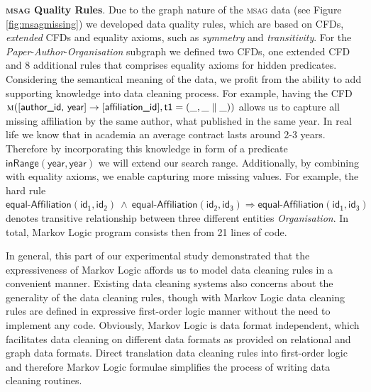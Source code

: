 \textbf{\textsc{msag} Quality Rules}.  
Due to the graph nature of the \textsc{msag} data (see Figure \ref{fig:msagmissing}) we developed data quality rules, which are based on CFDs, \textit{extended} CFDs \cite{Chen2009extended} and equality axioms, such as \textit{symmetry} and \textit{transitivity}. For the \textit{Paper}-\textit{Author}-\textit{Organisation} subgraph we defined two CFDs, one extended CFD and 8 additional rules that comprises equality axioms for hidden predicates. Considering the semantical meaning of the data, we profit from the ability to add supporting knowledge into data cleaning process. For example, having the CFD$\mathsf{\textsc{m}([\textsf{author\_id, year}] \rightarrow [\textsf{affiliation\_id}],t1=(\_,\_ \parallel \_))} $  allows us to capture all missing affiliation by the same author, what published in the same year. In real life we know that in academia an average contract lasts around 2-3 years. Therefore by incorporating this knowledge in form of a predicate $\mathsf{\textsf{inRange}(year, year)}$ we will extend our search range. Additionally, by combining with equality axioms, we enable capturing more missing values. For example, the hard rule $\mathsf{\textsf{equal-Affiliation}(id_1, id_2) ~\wedge~ \textsf{equal-Affiliation}(id_2, id_3) \Rightarrow  \textsf{equal-Affiliation}(id_1, id_3)}$ denotes transitive relationship between three different entities \textit{Organisation}. In total, Markov Logic program consists then from 21 lines of code.

In general, this part of our experimental study demonstrated that the expressiveness of Markov Logic affords us to model data cleaning rules in a convenient manner. Existing data cleaning systems \cite{Dallachiesa:2013:NCD:2463676.2465327} also concerns about the generality of the data cleaning rules, though with Markov Logic data cleaning rules are defined in expressive first-order logic manner without the need to implement any code.  Obviously, Markov Logic is data format independent, which facilitates data cleaning on different data formats as provided on relational and graph data formats. Direct translation data cleaning rules into first-order logic and therefore Markov Logic formulae simplifies the process of writing data cleaning routines. 


